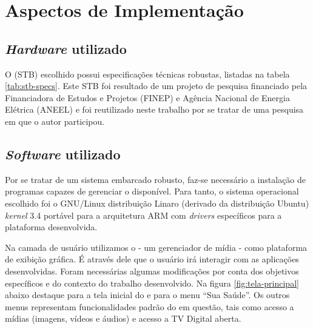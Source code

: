 \chapter{Aspectos de Implementação}


\section{\textit{Hardware} utilizado}\label{sec:hardware-utilizado}

O \stb[] (STB) escolhido possui especificações técnicas robustas, listadas na 
tabela \ref{tab:stb-specs}. Este STB foi resultado de um projeto de pesquisa
financiado pela Financiadora de Estudos e Projetos (FINEP) e Agência Nacional
de Energia Elétrica (ANEEL) e foi reutilizado neste trabalho por se tratar de 
uma pesquisa em que o autor participou.



\section{\textit{Software} utilizado}\label{sec:software-utilizado}

Por se tratar de um sistema embarcado robusto, faz-se necessário a instalação
de programas capazes de gerenciar o \hardware[] disponível. Para tanto, o
sistema operacional escolhido foi o GNU/Linux distribuição Linaro (derivado da
distribuição Ubuntu) \textit{kernel} 3.4 portável para a arquitetura 
ARM com \textit{drivers} específicos para a plataforma desenvolvida.



Na camada de usuário utilizamos o \software[] \xbmc[] - um gerenciador de mídia
- como plataforma de exibição gráfica. É através dele que o usuário irá 
interagir com as aplicações desenvolvidas. Foram necessárias algumas 
modificações por conta dos objetivos específicos e do contexto do trabalho 
desenvolvido. Na figura \ref{fig:tela-principal} abaixo destaque para a tela 
inicial do \software[] \xbmc[] e para o menu ``Sua Saúde''. Os outros menus
representam funcionalidades padrão do \software[] em questão, tais como
acesso a mídias (imagens, vídeos e áudios) e acesso a TV Digital aberta.

